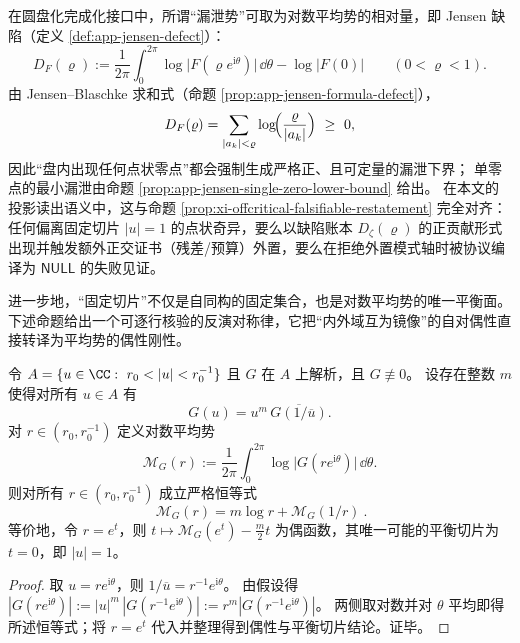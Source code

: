 在圆盘化完成化接口中，所谓“漏泄势”可取为对数平均势的相对量，即 Jensen 缺陷（定义 \ref{def:app-jensen-defect}）：
\[
D_F(\varrho)
:=\frac{1}{2\pi}\int_{0}^{2\pi}\log\bigl|F(\varrho e^{\mathrm{i}\theta})\bigr|\,\dd\theta
-\log|F(0)|
\qquad(0<\varrho<1).
\]
由 Jensen--Blaschke 求和式（命题 \ref{prop:app-jensen-formula-defect}），
\[
D_F(\varrho)=\sum_{|a_k|<\varrho}\log\!\Bigl(\frac{\varrho}{|a_k|}\Bigr)\ \ge\ 0,
\]
因此“盘内出现任何点状零点”都会强制生成严格正、且可定量的漏泄下界；
单零点的最小漏泄由命题 \ref{prop:app-jensen-single-zero-lower-bound} 给出。
在本文的投影读出语义中，这与命题 \ref{prop:xi-offcritical-falsifiable-restatement} 完全对齐：任何偏离固定切片 \(|u|=1\) 的点状奇异，要么以缺陷账本 \(D_\zeta(\varrho)\) 的正贡献形式出现并触发额外正交证书（残差/预算）外置，要么在拒绝外置模式轴时被协议编译为 \(\mathsf{NULL}\) 的失败见证。
\par
进一步地，“固定切片”不仅是自同构的固定集合，也是对数平均势的唯一平衡面。
下述命题给出一个可逐行核验的反演对称律，它把“内外域互为镜像”的自对偶性直接转译为平均势的偶性刚性。

\begin{proposition}[自对偶对称下的对数平均势反演律]\label{prop:xi-selfdual-mean-potential-inversion}
令 \(A=\{u\in\CC:\ r_0<|u|<r_0^{-1}\}\) 且 \(G\) 在 \(A\) 上解析，且 \(G\not\equiv 0\)。
设存在整数 \(m\) 使得对所有 \(u\in A\) 有
\[
G(u)=u^{m}\,\overline{G(1/\overline{u})}.
\]
对 \(r\in(r_0,r_0^{-1})\) 定义对数平均势
\[
\mathcal{M}_G(r):=\frac{1}{2\pi}\int_{0}^{2\pi}\log\bigl|G(re^{\mathrm{i}\theta})\bigr|\,\dd\theta.
\]
则对所有 \(r\in(r_0,r_0^{-1})\) 成立严格恒等式
\[
\boxed{\ \mathcal{M}_G(r)=m\log r+\mathcal{M}_G(1/r)\ }.
\]
等价地，令 \(r=e^t\)，则 \(t\mapsto \mathcal{M}_G(e^t)-\frac{m}{2}t\) 为偶函数，其唯一可能的平衡切片为 \(t=0\)，即 \(|u|=1\)。
\end{proposition}

\begin{proof}
取 \(u=re^{\mathrm{i}\theta}\)，则 \(1/\overline{u}=r^{-1}e^{\mathrm{i}\theta}\)。
由假设得
\(
|G(re^{\mathrm{i}\theta})|
:=|u|^{m}\,|G(r^{-1}e^{\mathrm{i}\theta})|
:=r^{m}|G(r^{-1}e^{\mathrm{i}\theta})|
\)。
两侧取对数并对 \(\theta\) 平均即得所述恒等式；将 \(r=e^t\) 代入并整理得到偶性与平衡切片结论。证毕。
\end{proof}

